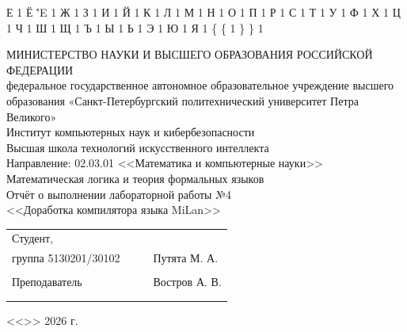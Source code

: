 \documentclass[a4paper,final]{article}
\begin{document}
{  {Е}{ {\selectfont{}} }1
  {Ё}{ {\''E} }1
  {Ж}{ {\selectfont{}} }1
  {З}{ {\selectfont{}} }1
  {И}{ {\selectfont{}} }1
  {Й}{ {\selectfont{}} }1
  {К}{ {\selectfont{}} }1
  {Л}{ {\selectfont{}} }1
  {М}{ {\selectfont{}} }1
  {Н}{ {\selectfont{}} }1
  {О}{ {\selectfont{}} }1
  {П}{ {\selectfont{}} }1
  {Р}{ {\selectfont{}} }1
  {С}{ {\selectfont{}} }1
  {Т}{ {\selectfont{}} }1
  {У}{ {\selectfont{}} }1
  {Ф}{ {\selectfont{}} }1
  {Х}{ {\selectfont{}} }1
  {Ц}{ {\selectfont{}} }1
  {Ч}{ {\selectfont{}} }1
  {Ш}{ {\selectfont{}} }1
  {Щ}{ {\selectfont{}} }1
  {Ъ}{ {\selectfont{}} }1
  {Ы}{ {\selectfont{}} }1
  {Ь}{ {\selectfont{}} }1
  {Э}{ {\selectfont{}} }1
  {Ю}{ {\selectfont{}} }1
  {Я}{ {\selectfont{}} }1
  {\{}{ { {\color{brackets}\{} } }1 %
  {\} }{ { {\color{brackets}\} } } }1 %
}


\thispagestyle{empty}
\begin{center}
\hfill \break
\hfill \break
\normalsize{МИНИСТЕРСТВО НАУКИ И ВЫСШЕГО ОБРАЗОВАНИЯ РОССИЙСКОЙ ФЕДЕРАЦИИ\\
 федеральное государственное автономное образовательное учреждение высшего образования «Санкт-Петербургский политехнический университет Петра Великого»\\[10pt]}
\normalsize{Институт компьютерных наук и кибербезопасности}\\[10pt] 
\normalsize{Высшая школа технологий искусственного интеллекта}\\[10pt] 
\normalsize{Направление: 02.03.01 <<Математика и компьютерные науки>>}\\
\vspace{50pt}
{\large Математическая логика и теория формальных языков\\
Отчёт о выполнении лабораторной работы №4 \\[1em]
<<Доработка компилятора языка MiLan>>}
\end{center}
 \vspace{70pt}
\small{ 
\begin{tabular}{lrrl}
\!\!\!Студент, & \hspace{2cm} & & \\
\!\!\!группа 5130201/30102 & \hspace{2cm} & \underline{\hspace{3cm}} & Путята М. А.  \\\\
\!\!\!Преподаватель & \hspace{2cm} & \underline{\hspace{3cm}} &  Востров А. В. \\\\
&&\hspace{5cm}
\end{tabular}
\begin{flushright}
<<\underline{\hspace{1cm}}>>\underline{\hspace{2.5cm}} 2026 г.
\end{flushright}
}
\end{document}
